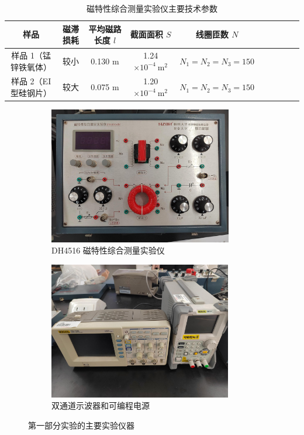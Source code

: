 \documentclass[UTF8]{article}
\theoremstyle{MyLineTheoremStyle} %
\theoremstyle{MyBlockTheoremStyle} %
\theoremstyle{MySubsubsectionStyle} %
\begin{document}
\begin{table}[H]\centering
    \caption{磁特性综合测量实验仪主要技术参数}
    \label{磁特性综合测量实验仪主要技术参数}
\begin{tabular}{cccccccccc}\toprule
    样品 & 磁滞损耗 & 平均磁路长度 $l$ & 截面面积 $S$ & 线圈匝数 $N$  \\
    \midrule
    样品 1（锰锌铁氧体）  & 较小 &  0.130 m & 1.24 $\times 10^{-4}\  \mathrm{m^2}$ & $N_1 = N_2 = N_3 = 150$\\
    样品 2（EI 型硅钢片） & 较大 &  0.075 m & 1.20 $\times 10^{-4}\  \mathrm{m^2}$ & $N_1 = N_2 = N_3 = 150$\\
    \bottomrule
\end{tabular}
\end{table}

\begin{figure}[H]\centering
\begin{subfigure}[b]{0.5\columnwidth}\centering
    \includegraphics[height=170pt]{assets/DH4516 磁特性综合测量实验仪.jpg}
    \caption{DH4516 磁特性综合测量实验仪}
\end{subfigure}\hfill
\begin{subfigure}[b]{0.5\columnwidth}\centering
    \includegraphics[height=170pt]{assets/示波器和可编程电源.jpg}
    \caption{双通道示波器和可编程电源}
\end{subfigure}
\caption{第一部分实验的主要实验仪器}
\end{figure}
\end{document}
